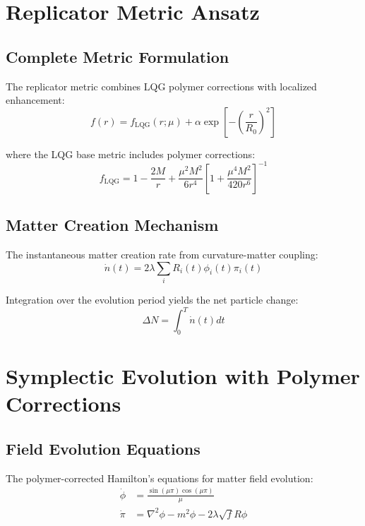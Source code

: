 \documentclass[11pt]{article}
\begin{document}
\section{Replicator Metric Ansatz}

\subsection{Complete Metric Formulation}

The replicator metric combines LQG polymer corrections with localized enhancement:
\begin{equation}
f(r) = f_{\text{LQG}}(r;\mu) + \alpha \exp\left[-\left(\frac{r}{R_0}\right)^2\right]
\end{equation}

where the LQG base metric includes polymer corrections:
\begin{equation}
f_{\text{LQG}} = 1 - \frac{2M}{r} + \frac{\mu^2 M^2}{6r^4}\left[1 + \frac{\mu^4 M^2}{420r^6}\right]^{-1}
\end{equation}

\subsection{Matter Creation Mechanism}

The instantaneous matter creation rate from curvature-matter coupling:
\begin{equation}
\dot{n}(t) = 2\lambda \sum_i R_i(t) \phi_i(t) \pi_i(t)
\end{equation}

Integration over the evolution period yields the net particle change:
\begin{equation}
\Delta N = \int_0^T \dot{n}(t) dt
\end{equation}

\section{Symplectic Evolution with Polymer Corrections}

\subsection{Field Evolution Equations}

The polymer-corrected Hamilton's equations for matter field evolution:
\begin{align}
\dot{\phi} &= \frac{\sin(\mu\pi)\cos(\mu\pi)}{\mu} \\
\dot{\pi} &= \nabla^2\phi - m^2\phi - 2\lambda\sqrt{f}R\phi
\end{align}
\end{document}
